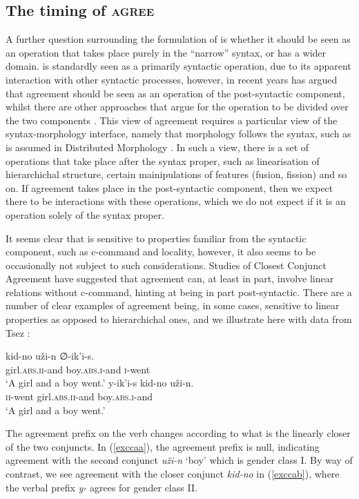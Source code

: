 \documentclass[output=paper
,modfonts
,nonflat]{langsci/langscibook}
\begin{document}
\subsection{The timing of \textsc{agree}}
\label{sectiming}

A further question surrounding the formulation of \agr{} is whether it should be seen as an operation that takes place purely in the ``narrow'' syntax, or has a wider domain.
\agr{} is standardly seen as a primarily syntactic operation, due to its apparent interaction with other syntactic processes, however, in recent years \cite{Bobaljik2008} has argued that agreement should be seen as an operation of the post-syntactic component, whilst there are other approaches that argue for the operation to be divided over the two components \citep{benmamounetal2009,bhattwalkow2013,marusicetal2015}.
This view of agreement requires a particular view of the syntax-morphology interface, namely that morphology follows the syntax, such as is assumed in Distributed Morphology \citep{hallemarantz1993,arreginevins2012}.
In such a view, there is a set of operations that take place after the syntax proper, such as linearisation of hierarchichal structure, certain mainipulations of features (fusion, fission) and so on.
If agreement takes place in the post-syntactic component, then we expect there to be interactions with these operations, which we do not expect if it is an operation solely of the syntax proper.

It seems clear that \agr{} is sensitive to properties familiar from the syntactic component, such as c-command and locality, however, it also seems to be occasionally not subject to such considerations.
Studies of Closest Conjunct Agreement have suggested that agreement can, at least in part, involve linear relations without c-command, hinting at being in part post-syntactic.
There are a number of clear examples of agreement being, in some cases, sensitive to linear properties as opposed to hierarchichal ones, and we illustrate here with data from Tsez \citep{benmamounetal2009}:

\begin{exe}
	\ex
	\begin{xlist}
		\ex
		\gll kid-no u\v{z}i-n ∅-ik'i-s.\\
		girl.\textsc{abs.ii}-and boy.\textsc{abs.i}-and \textsc{i}-went\\
		\glt `A girl and a boy went.' \label{exccaa}
		\ex
		\gll y-ik'i-s kid-no u\v{z}i-n.\\
		\textsc{ii}-went girl.\textsc{abs.ii}-and boy.\textsc{abs.i}-and\\
		\glt `A girl and a boy went.' \label{exccab}
	\end{xlist}
\end{exe}
The agreement prefix on the verb changes according to what is the linearly closer of the two conjuncts.
In (\ref{exccaa}), the agreement prefix is null, indicating agreement with the second conjunct \emph{u\v{z}i-n} `boy' which is gender class I.
By way of contrast, we see agreement with the closer conjunct \emph{kid-no} in (\ref{exccab}), where the verbal prefix \emph{y-} agrees for gender class II.
\end{document}
